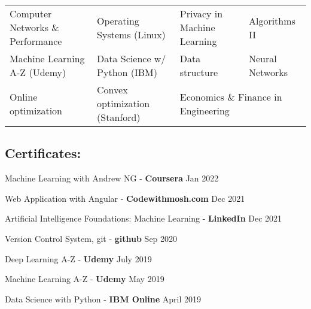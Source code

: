 \begin{tabular}{p{5.9cm}p{5.3cm}p{5cm}p{5cm}}
	Computer Networks \& Performance & Operating Systems (Linux) & Privacy in Machine Learning & Algorithms II\\
	Machine Learning A-Z (Udemy) & Data Science w/ Python (IBM) & Data structure & Neural Networks \\
	Online optimization & Convex optimization (Stanford) & \multicolumn{2}{l}{Economics \& Finance in Engineering}\\
\end{tabular}
\subsection{Certificates:}
\begin{zitemize}
	\item Machine Learning with Andrew NG - \textbf{Coursera} \hfill Jan 2022
	\item Web Application with Angular - \textbf{Codewithmosh.com} \hfill Dec 2021
	\item Artificial Intelligence Foundations: Machine Learning - \textbf{LinkedIn} \hfill Dec 2021
	\item Version Control System, git - \textbf{github} \hfill Sep 2020
	\item Deep Learning A-Z - \textbf{Udemy} \hfill July 2019
	\item Machine Learning A-Z - \textbf{Udemy} \hfill May 2019
	\item Data Science with Python - \textbf{IBM Online} \hfill April 2019
\end{zitemize}